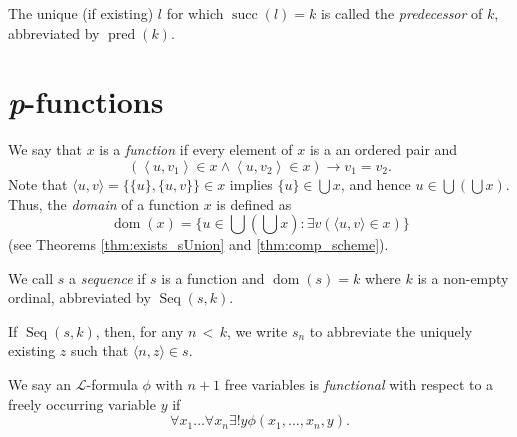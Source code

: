 \begin{definition}[Predecessor]
    \label{def:IsOrd.pred}
    \leanok
    The unique (if existing) $l$ for which $\operatorname{succ}(l) = k$ is called the 
    \textit{predecessor} of $k$, abbreviated by $\operatorname{pred}(k)$.
\end{definition}

\section{\textit{p}-functions}

\begin{definition}
    \label{def:IsFunc+IsFunc.dom}
    \leanok
    We say that $x$ is a \textit{function} if every element of $x$ is a an ordered pair and
    $$ 
    \left(\left\langle u, v_1\right\rangle \in x \wedge\left\langle u, v_2\right\rangle 
    \in x\right) \rightarrow v_1=v_2.
    $$
    Note that $\langle u, v\rangle = \{\{u\}, \{u,v\}\} \in x$ implies $\{u\} \in \bigcup x$, and 
    hence $u \in \bigcup\left(\bigcup x\right)$.
    Thus, the \textit{domain} of a function $x$ is defined as
    $$
    \operatorname{dom}(x)=\{u \in \bigcup\left(\bigcup x\right): 
    \exists v(\langle u, v\rangle \in x)\}
    $$
    (see Theorems \ref{thm:exists_sUnion} and \ref{thm:comp_scheme}).
\end{definition}

\begin{definition}[Sequence]
    \label{def:IsSeq}
    \leanok
    We call $s$ a \textit{sequence} if $s$ is a function and $\operatorname{dom}(s)=k$ 
    where $k$ is a non-empty ordinal, abbreviated by $\operatorname{Seq}(s,k)$.

    If $\operatorname{Seq}(s,k)$, then, for any $n\,<\,k$, we write $s_n$ to abbreviate the 
    uniquely existing $z$ such that $\langle n, z\rangle \in s$.
\end{definition}

\begin{definition}[Functional]
    \label{def:IsFunctional}
    \leanok
    We say an $\mathcal{L}$-formula $\phi$ with $n+1$ free variables is \textit{functional} 
    with respect to a freely occurring variable $y$ if 
    $$
    \forall x_1 \ldots \forall x_n \exists! y  \phi (x_1,\ldots, x_n, y).
    $$
\end{definition}

